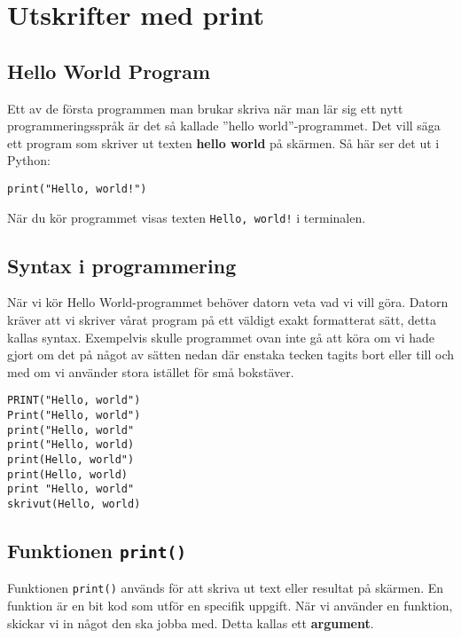 
\section{Utskrifter med print}
\label{section:print}
\subsection{Hello World Program}
Ett av de första programmen man brukar skriva när man lär sig ett nytt programmeringsspråk är det så kallade ''hello world''-programmet. Det vill säga ett program som skriver ut texten \textbf{hello world} på skärmen. 
Så här ser det ut i Python:
\begin{lstlisting}[title=Hello World-program]
print("Hello, world!")
\end{lstlisting}

När du kör programmet visas texten \texttt{Hello, world!} i terminalen.


\subsection{Syntax i programmering}
När vi kör Hello World-programmet behöver datorn veta vad vi vill göra. 
Datorn kräver att vi skriver vårat program på ett väldigt exakt formatterat sätt, detta kallas syntax.
Exempelvis skulle programmet ovan inte gå att köra om vi hade gjort om det på något av sätten nedan där 
enstaka tecken tagits bort eller till och med om vi använder stora istället för små bokstäver.
\begin{lstlisting}[title=Felaktig syntax i kod]
PRINT("Hello, world")
Print("Hello, world")
print("Hello, world"
print("Hello, world)
print(Hello, world")
print(Hello, world)
print "Hello, world"
skrivut(Hello, world)
\end{lstlisting}



\subsection{Funktionen \texttt{print()}}
Funktionen \texttt{print()} används för att skriva ut text eller resultat på skärmen. En funktion är en bit kod som utför en specifik uppgift. När vi använder en funktion, skickar vi in något den ska jobba med. Detta kallas ett \textbf{argument}.

